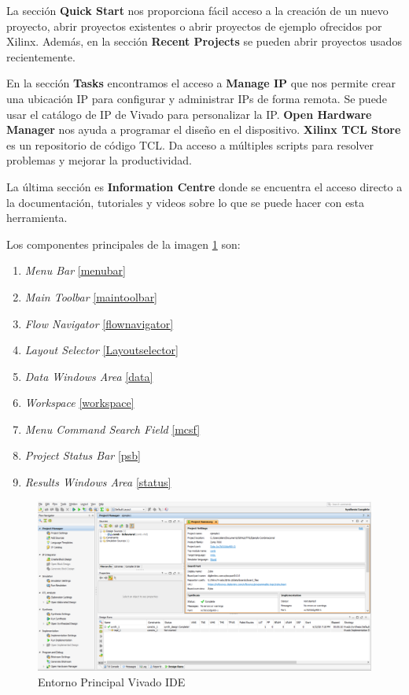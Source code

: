 La sección \textbf{Quick Start} nos proporciona fácil acceso a la creación de un nuevo proyecto, abrir proyectos existentes o abrir proyectos 
de ejemplo ofrecidos por Xilinx. Además, en la sección \textbf{Recent Projects} se pueden abrir proyectos usados recientemente.

En la sección \textbf{Tasks} encontramos el acceso a \textbf{Manage IP} que nos permite crear una ubicación IP  para configurar y administrar 
IPs de forma remota. Se puede usar el catálogo de IP de Vivado para personalizar la IP. \textbf{Open Hardware Manager} nos ayuda a programar 
el diseño en el dispositivo. \textbf{Xilinx TCL Store} es un repositorio de código TCL. Da acceso a múltiples scripts para resolver problemas y 
mejorar la productividad.

La última sección es \textbf{Information Centre} donde se encuentra el acceso directo a la documentación, tutoriales y videos sobre lo que se 
puede hacer con esta herramienta.

Los componentes principales de la imagen \ref{vivado2} son:
\begin{enumerate}
    \item \textit{Menu Bar} \ref{menubar}
    \item \textit{Main Toolbar} \ref{maintoolbar}
    \item \textit{Flow Navigator} \ref{flownavigator}
    \item \textit{Layout Selector} \ref{Layoutselector}
    \item \textit{Data Windows Area} \ref{data}
    \item \textit{Workspace} \ref{workspace}
    \item \textit{Menu Command Search Field} \ref{mcsf}
    \item \textit{Project Status Bar} \ref{psb}
    \item \textit{Results Windows Area} \ref{status}
\end{enumerate}

\begin{figure}[H]
    \centering
    \includegraphics[width = 1\textwidth]{imagenes/vivado2.png}
    \caption{Entorno Principal Vivado IDE}\label{vivado2}
\end{figure}

